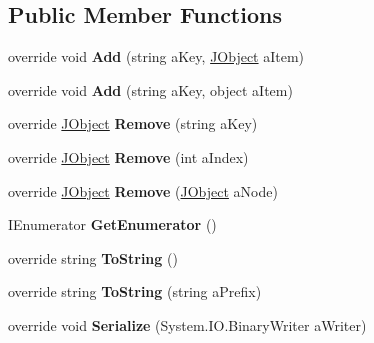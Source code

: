 \subsection*{Public Member Functions}
\begin{DoxyCompactItemize}
\item 
\hypertarget{class_simple_j_s_o_n_1_1_j_s_o_n_class_a00c5767efd02eb45a9c28cca783968bd}{override void {\bfseries Add} (string a\+Key, \hyperlink{class_simple_j_s_o_n_1_1_j_object}{J\+Object} a\+Item)}\label{class_simple_j_s_o_n_1_1_j_s_o_n_class_a00c5767efd02eb45a9c28cca783968bd}

\item 
\hypertarget{class_simple_j_s_o_n_1_1_j_s_o_n_class_a0caa59f392e9b7528f1f489f2231a577}{override void {\bfseries Add} (string a\+Key, object a\+Item)}\label{class_simple_j_s_o_n_1_1_j_s_o_n_class_a0caa59f392e9b7528f1f489f2231a577}

\item 
\hypertarget{class_simple_j_s_o_n_1_1_j_s_o_n_class_a0ed64825c6b1e2d15287b0c7b8a1e14f}{override \hyperlink{class_simple_j_s_o_n_1_1_j_object}{J\+Object} {\bfseries Remove} (string a\+Key)}\label{class_simple_j_s_o_n_1_1_j_s_o_n_class_a0ed64825c6b1e2d15287b0c7b8a1e14f}

\item 
\hypertarget{class_simple_j_s_o_n_1_1_j_s_o_n_class_a57013311522930363eba5d118ab5211c}{override \hyperlink{class_simple_j_s_o_n_1_1_j_object}{J\+Object} {\bfseries Remove} (int a\+Index)}\label{class_simple_j_s_o_n_1_1_j_s_o_n_class_a57013311522930363eba5d118ab5211c}

\item 
\hypertarget{class_simple_j_s_o_n_1_1_j_s_o_n_class_a2f604ccee20d899cf0ce0ddf908095b3}{override \hyperlink{class_simple_j_s_o_n_1_1_j_object}{J\+Object} {\bfseries Remove} (\hyperlink{class_simple_j_s_o_n_1_1_j_object}{J\+Object} a\+Node)}\label{class_simple_j_s_o_n_1_1_j_s_o_n_class_a2f604ccee20d899cf0ce0ddf908095b3}

\item 
\hypertarget{class_simple_j_s_o_n_1_1_j_s_o_n_class_a68426db5b991a4d234578b239517e7a6}{I\+Enumerator {\bfseries Get\+Enumerator} ()}\label{class_simple_j_s_o_n_1_1_j_s_o_n_class_a68426db5b991a4d234578b239517e7a6}

\item 
\hypertarget{class_simple_j_s_o_n_1_1_j_s_o_n_class_a7e79e6ce1bb70b8eea59055a912c7cd7}{override string {\bfseries To\+String} ()}\label{class_simple_j_s_o_n_1_1_j_s_o_n_class_a7e79e6ce1bb70b8eea59055a912c7cd7}

\item 
\hypertarget{class_simple_j_s_o_n_1_1_j_s_o_n_class_ae729e88465d796f3b408b54edca7f22f}{override string {\bfseries To\+String} (string a\+Prefix)}\label{class_simple_j_s_o_n_1_1_j_s_o_n_class_ae729e88465d796f3b408b54edca7f22f}

\item 
\hypertarget{class_simple_j_s_o_n_1_1_j_s_o_n_class_ae72d669667b7ff3f48a4f9653d7687cb}{override void {\bfseries Serialize} (System.\+I\+O.\+Binary\+Writer a\+Writer)}\label{class_simple_j_s_o_n_1_1_j_s_o_n_class_ae72d669667b7ff3f48a4f9653d7687cb}

\end{DoxyCompactItemize}
